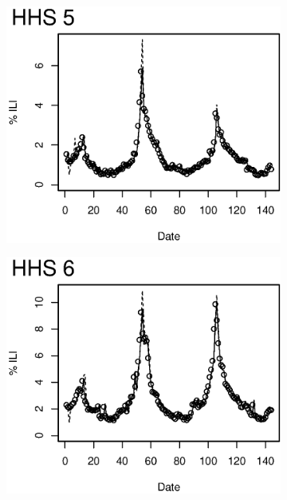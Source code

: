 \begin{figure}
\\
\begin{subfigure}[b]{0.49\textwidth}
	\includegraphics[width=\textwidth]{longitude/figs/nowcastHHS_5.eps}
\end{subfigure}
\begin{subfigure}[b]{0.49\textwidth}
	\includegraphics[width=\textwidth]{longitude/figs/nowcastHHS_6.eps}
\end{subfigure}
\end{figure}

